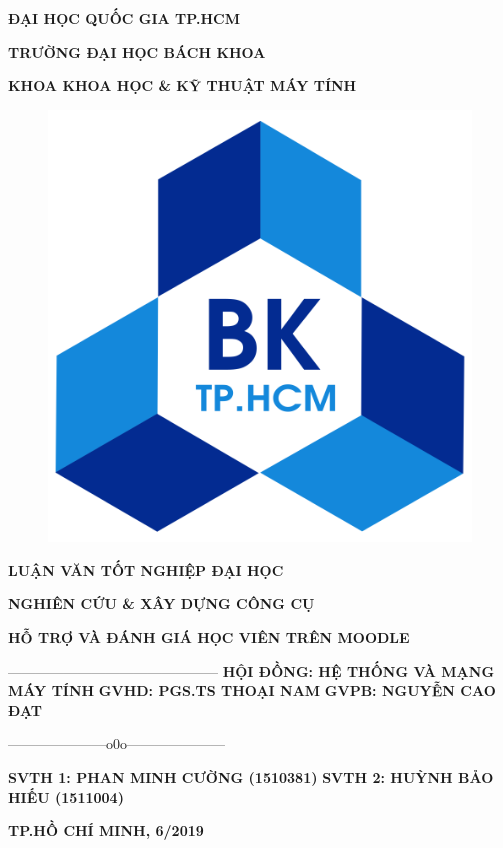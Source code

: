 
\begin{titlepage}
	\centerline{\fontsize{15}{15}\bf ĐẠI HỌC QUỐC GIA TP.HCM}
	\centerline{\fontsize{15}{15}\bf TRƯỜNG ĐẠI HỌC BÁCH KHOA}
	\centerline{\fontsize{15}{15}\bf KHOA KHOA HỌC \& KỸ THUẬT MÁY TÍNH}
	\begin{center}
		\begin{figure}[htp]
			\begin{center}
				\includegraphics[scale=0.1]{img/logo}
			\end{center}
		\end{figure}
	\end{center}
	\centerline{\fontsize{15}{15}\bf LUẬN VĂN TỐT NGHIỆP ĐẠI HỌC}
	\vspace*{2cm}
	\centerline{\Large\bf NGHIÊN CỨU \& XÂY DỰNG CÔNG CỤ}
	\vspace*{0.5cm}
	\centerline{\Large\bf HỖ TRỢ VÀ ĐÁNH GIÁ HỌC VIÊN TRÊN MOODLE}
	\vskip 0.5cm
	\hskip 4.9cm {———————————————}
	\vskip 1.5cm
	\hskip3cm{\fontsize{15}{15}\bf HỘI ĐỒNG: HỆ THỐNG VÀ MẠNG MÁY TÍNH}
	\vskip 0.5cm
	\hskip3cm{\fontsize{15}{15}\bf GVHD: PGS.TS THOẠI NAM}
	\vskip 0.5cm
	\hskip3cm{\fontsize{15}{15}\bf GVPB: NGUYỄN CAO ĐẠT}
	\vskip 0.5cm
	\centerline{———————o0o———————}
	\vskip 0.5cm
	\hskip3cm{\fontsize{15}{15}\bf SVTH 1: PHAN MINH CƯỜNG (1510381)}
	\vskip 0.5cm
	\hskip3cm{\fontsize{15}{15}\bf SVTH 2: HUỲNH BẢO HIẾU (1511004)}
	\vfill
	\centerline{\bf TP.HỒ CHÍ MINH, 6/2019}
\end{titlepage}